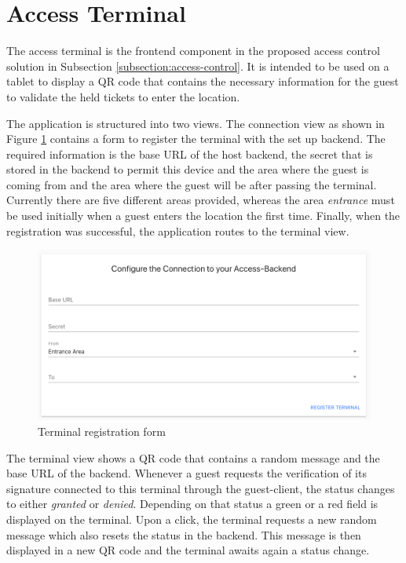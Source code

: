 \section{Access Terminal}\label{design:access-terminal}
The access terminal is the frontend component in the proposed access control solution in Subsection \ref{subsection:access-control}. It is intended to be used on a tablet to display a QR code that contains the necessary information for the guest to validate the held tickets to enter the location.

The application is structured into two views. The connection view as shown in Figure \ref{img:terminal-registration-form} contains a form to register the terminal with the set up backend. The required information is the base URL of the host backend, the secret that is stored in the backend to permit this device and the area where the guest is coming from and the area where the guest will be after passing the terminal. Currently there are five different areas provided, whereas the area \textit{entrance} must be used initially when a guest enters the location the first time. Finally, when the registration was successful, the application routes to the terminal view.

\begin{figure}[H]
    \centering
    \includegraphics[width=15cm]{images/terminal-registration.png}
    \caption{Terminal registration form \protect}
    \label{img:terminal-registration-form}
\end{figure}

The terminal view shows a QR code that contains a random message and the base URL of the backend. Whenever a guest requests the verification of its signature connected to this terminal through the guest-client, the status changes to either \textit{granted} or \textit{denied}. Depending on that status a green or a red field is displayed on the terminal. Upon a click, the terminal requests a new random message which also resets the status in the backend. This message is then displayed in a new QR code and the terminal awaits again a status change.
